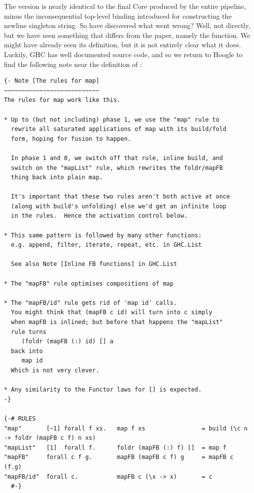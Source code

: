 The version is nearly identical to the final Core produced by the entire pipeline, minus the inconsequential top-level binding introduced for constructing the newline
singleton string. So have discovered what went wrong? Well, not directly, but we have seen something that differs from the paper, namely the  function.
We might have already seen its definition, but it is not entirely clear what it does. Luckily, GHC has well documented source code, and so we return to Hoogle to find
the following note near the definition of :

\begin{listing}[H]
\begin{verbatim}
{- Note [The rules for map]
~~~~~~~~~~~~~~~~~~~~~~~~~~~
The rules for map work like this.

* Up to (but not including) phase 1, we use the "map" rule to
  rewrite all saturated applications of map with its build/fold
  form, hoping for fusion to happen.

  In phase 1 and 0, we switch off that rule, inline build, and
  switch on the "mapList" rule, which rewrites the foldr/mapFB
  thing back into plain map.

  It's important that these two rules aren't both active at once
  (along with build's unfolding) else we'd get an infinite loop
  in the rules.  Hence the activation control below.

* This same pattern is followed by many other functions:
  e.g. append, filter, iterate, repeat, etc. in GHC.List

  See also Note [Inline FB functions] in GHC.List

* The "mapFB" rule optimises compositions of map

* The "mapFB/id" rule gets rid of 'map id' calls.
  You might think that (mapFB c id) will turn into c simply
  when mapFB is inlined; but before that happens the "mapList"
  rule turns
     (foldr (mapFB (:) id) [] a
  back into
     map id
  Which is not very clever.

* Any similarity to the Functor laws for [] is expected.
-}

{-# RULES
"map"       [~1] forall f xs.   map f xs                = build (\c n -> foldr (mapFB c f) n xs)
"mapList"   [1]  forall f.      foldr (mapFB (:) f) []  = map f
"mapFB"     forall c f g.       mapFB (mapFB c f) g     = mapFB c (f.g)
"mapFB/id"  forall c.           mapFB c (\x -> x)       = c
  #-}
\end{verbatim}
\end{listing}

